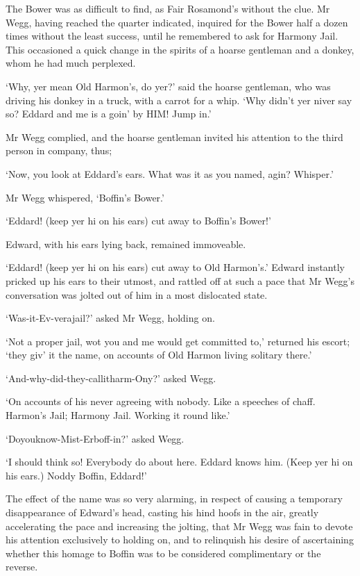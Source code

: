 The Bower was as difficult to find, as Fair Rosamond’s without the clue.
Mr Wegg, having reached the quarter indicated, inquired for the Bower
half a dozen times without the least success, until he remembered to
ask for Harmony Jail. This occasioned a quick change in the spirits of a
hoarse gentleman and a donkey, whom he had much perplexed.

‘Why, yer mean Old Harmon’s, do yer?’ said the hoarse gentleman, who was
driving his donkey in a truck, with a carrot for a whip. ‘Why didn’t yer
niver say so? Eddard and me is a goin’ by HIM! Jump in.’

Mr Wegg complied, and the hoarse gentleman invited his attention to the
third person in company, thus;

‘Now, you look at Eddard’s ears. What was it as you named, agin?
Whisper.’

Mr Wegg whispered, ‘Boffin’s Bower.’

‘Eddard! (keep yer hi on his ears) cut away to Boffin’s Bower!’

Edward, with his ears lying back, remained immoveable.

‘Eddard! (keep yer hi on his ears) cut away to Old Harmon’s.’ Edward
instantly pricked up his ears to their utmost, and rattled off at such
a pace that Mr Wegg’s conversation was jolted out of him in a most
dislocated state.

‘Was-it-Ev-verajail?’ asked Mr Wegg, holding on.

‘Not a proper jail, wot you and me would get committed to,’ returned
his escort; ‘they giv’ it the name, on accounts of Old Harmon living
solitary there.’

‘And-why-did-they-callitharm-Ony?’ asked Wegg.

‘On accounts of his never agreeing with nobody. Like a speeches of
chaff. Harmon’s Jail; Harmony Jail. Working it round like.’

‘Doyouknow-Mist-Erboff-in?’ asked Wegg.

‘I should think so! Everybody do about here. Eddard knows him. (Keep yer
hi on his ears.) Noddy Boffin, Eddard!’

The effect of the name was so very alarming, in respect of causing a
temporary disappearance of Edward’s head, casting his hind hoofs in the
air, greatly accelerating the pace and increasing the jolting, that Mr
Wegg was fain to devote his attention exclusively to holding on, and to
relinquish his desire of ascertaining whether this homage to Boffin was
to be considered complimentary or the reverse.

